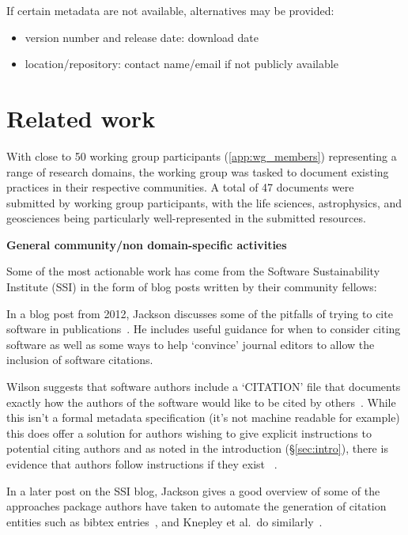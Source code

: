 \documentclass[11pt, oneside]{amsart}
\begin{document}
If certain metadata are not available, alternatives may be provided:
\begin{itemize}
\item version number and release date: download date
\item location\slash repository: contact name\slash email if not publicly
  available
\end{itemize}


\section{Related work}
\label{sec:related_work}

With close to 50 working group participants (\ref{app:wg_members}) representing a range of research domains, the working group was tasked to
document existing practices in their respective communities. A total of 47 documents were submitted by working group
participants, with the life sciences, astrophysics, and geosciences being particularly well-represented in the submitted
resources.

\textbf{General community/non domain-specific activities}

Some of the most actionable work has come from the Software Sustainability Institute (SSI) in the form of blog posts written by their community fellows:

In a blog post from 2012, Jackson discusses some of the pitfalls of trying to cite software in publications~\cite{ssi-how-to-cite}.
He includes useful guidance for when to consider citing software as well as some ways to help `convince' journal editors
to allow the inclusion of software citations.

Wilson suggests that software authors include a `CITATION' file that documents exactly how the
authors of the software would like to be cited by others~\cite{ssi-citation-files}. While this isn't a formal metadata specification (it's not machine
readable for example) this does offer a solution for authors wishing to give explicit instructions to potential citing authors and as noted in the introduction (\S\ref{sec:intro}), there is evidence that authors follow instructions if they exist ~\cite{10.1371/journal.pone.0136631}.

In a later post on the SSI blog, Jackson gives a good overview of some of the approaches
package authors have taken to automate the generation of citation entities such as bibtex entries~\cite{ssi-how-shalt-i-cite-thee},
and Knepley et al.\ do similarly~\cite{knepley2013accurately}.
\end{document}
